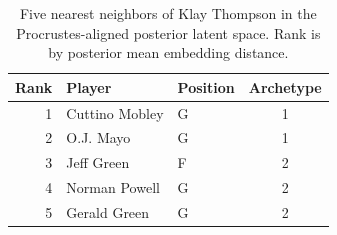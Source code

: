 \begin{table}[htbp]
  \centering\small
  \begin{tabular}{rllc}
    \toprule
    Rank & Player & Position & Archetype \\
    \midrule
    1 & Cuttino Mobley & G & 1 \\
    2 & O.J. Mayo & G & 1 \\
    3 & Jeff Green & F & 2 \\
    4 & Norman Powell & G & 2 \\
    5 & Gerald Green & G & 2 \\
    \bottomrule
  \end{tabular}
  \caption{Five nearest neighbors of Klay Thompson in the Procrustes-aligned posterior latent space. Rank is by posterior mean embedding distance.}
  \label{tab:Klay_Thompson_neighbors}
\end{table}

